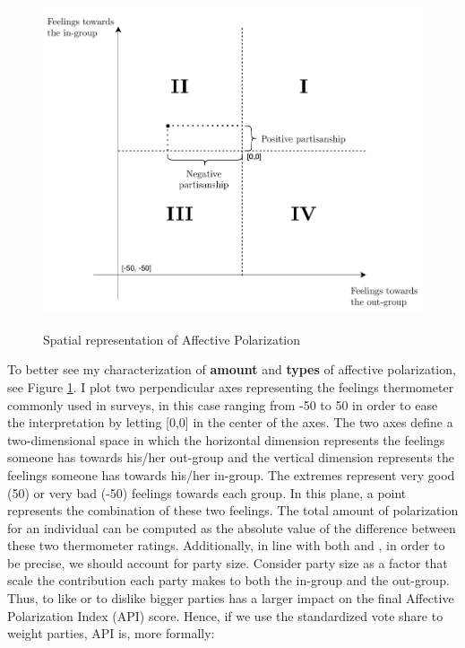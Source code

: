 \documentclass[a4paper, svgnames]{article}
\begin{document}
\begin{figure}[H]
	\caption{Spatial representation of Affective Polarization}
	\centering
	\includegraphics[width=\textwidth]{Figures/API-theory.pdf}
	\label{fig:types_and_levels_of_AP}
\end{figure}


To better see my characterization of \textbf{amount} and \textbf{types} of affective polarization, see Figure \ref{fig:types_and_levels_of_AP}. I plot two perpendicular axes representing the feelings thermometer commonly used in surveys, in this case ranging from -50 to 50 in order to ease the interpretation by letting [0,0] in the center of the axes. The two axes define a two-dimensional space in which the horizontal dimension represents the feelings someone has towards his/her out-group and the vertical dimension represents the feelings someone has towards his/her in-group. The extremes represent very good (50) or very bad (-50) feelings towards each group. In this plane, a point represents the combination of these two feelings. The total amount of polarization for an individual can be computed as the absolute value of the difference between these two thermometer ratings. Additionally, in line with both \citet*{Wagner2021} and \citet*{Reiljan2020}, in order to be precise, we should account for party size. Consider party size as a factor that scale the contribution each party makes to both the in-group and the out-group. Thus, to like or to dislike bigger parties has a larger impact on the final Affective Polarization Index (API) score. Hence, if we use the standardized vote share to weight parties, API is, more formally:
\end{document}
